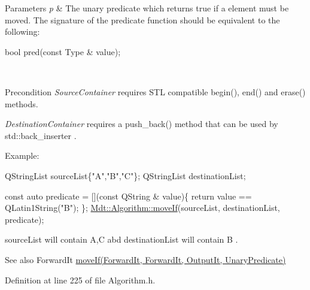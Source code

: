 \begin{DoxyParams}{Parameters}
{\em p} & The unary predicate which returns true if a element must be moved. The signature of the predicate function should be equivalent to the following\+: 
\begin{DoxyCode}
\textcolor{keywordtype}{bool} pred(\textcolor{keyword}{const} Type & value);
\end{DoxyCode}
 \\
\hline
\end{DoxyParams}
\begin{DoxyPrecond}{Precondition}
{\itshape Source\+Container} requires S\+TL compatible begin(), end() and erase() methods. 

{\itshape Destination\+Container} requires a push\+\_\+back() method that can be used by std\+::back\+\_\+inserter .
\end{DoxyPrecond}
Example\+: 
\begin{DoxyCode}
QStringList sourceList\{\textcolor{stringliteral}{"A"},\textcolor{stringliteral}{"B"},\textcolor{stringliteral}{"C"}\};
QStringList destinationList;

\textcolor{keyword}{const} \textcolor{keyword}{auto} predicate = [](\textcolor{keyword}{const} QString & value)\{
  \textcolor{keywordflow}{return} value == QLatin1String(\textcolor{stringliteral}{"B"});
\};
\hyperlink{namespace_mdt_1_1_algorithm_a1f739be25cc7de2c30a21b85d9b25f0a}{Mdt::Algorithm::moveIf}(sourceList, destinationList, predicate);
\end{DoxyCode}
 source\+List will contain A,C abd destination\+List will contain B .

\begin{DoxySeeAlso}{See also}
Forward\+It \hyperlink{namespace_mdt_1_1_algorithm_a1f739be25cc7de2c30a21b85d9b25f0a}{move\+If(\+Forward\+It, Forward\+It, Output\+It, Unary\+Predicate)} 
\end{DoxySeeAlso}


Definition at line 225 of file Algorithm.\+h.

